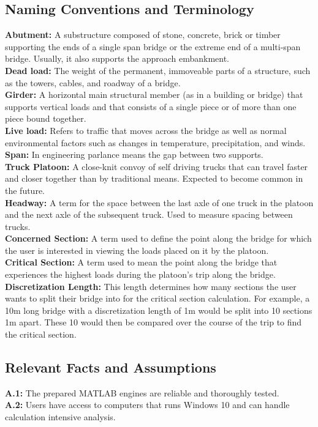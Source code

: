 \documentclass[12pt]{article}
\begin{document}
\subsection{Naming Conventions and Terminology}
\textbf{Abutment:} A substructure composed of stone, concrete, brick or timber supporting the ends of a single span bridge or the extreme end of a multi-span bridge. 
Usually, it also supports the approach embankment.\\
\textbf{Dead load:} The weight of the permanent, immoveable parts of a structure, such as the towers, cables, and roadway of a bridge.\\
\textbf{Girder:} A horizontal main structural member (as in a building or bridge) that supports vertical loads and that consists of a single piece or of more than one piece 
bound together.\\
\textbf{Live load:} Refers to traffic that moves across the bridge as well as normal environmental factors such as changes in temperature, precipitation, and winds.\\
\textbf{Span:} In engineering parlance means the gap between two supports.\\
\textbf{Truck Platoon:} A close-knit convoy of self driving trucks that can travel faster and closer together than by traditional means. Expected to become common 
in the future.\\
\textbf{Headway:} A term for the space between the last axle of one truck in the platoon and the next axle of the subsequent truck. Used to measure spacing between trucks.\\
\textbf{Concerned Section:} A term used to define the point along the bridge for which the user is interested in viewing the loads placed on it by the platoon.\\
\textbf{Critical Section:} A term used to mean the point along the bridge that experiences the highest loads during the platoon's trip along the bridge.\\
\textbf{Discretization Length:} This length determines how many sections the user wants to split their bridge into for the critical section calculation. For example,
a 10m long bridge with a discretization length of 1m would be split into 10 sections 1m apart. These 10 would then be compared over the course of the trip to find the 
critical section.\\  

\subsection{Relevant Facts and Assumptions}
\textbf{A.1:} The prepared MATLAB engines are reliable and thoroughly tested.\\
\textbf{A.2:} Users have access to computers that runs Windows 10 and can handle calculation intensive analysis.
\end{document}
